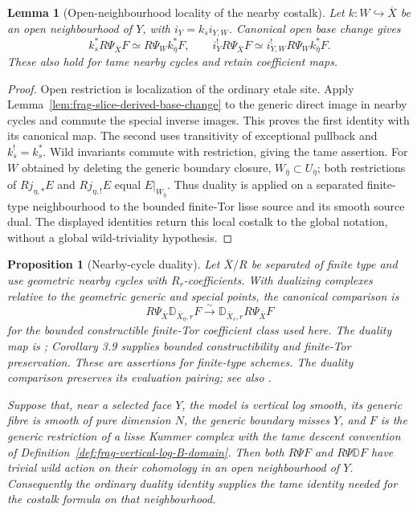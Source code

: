 \documentclass[11pt]{article}
\newtheorem{proposition}[theorem]{Proposition}
\newtheorem{lemma}[theorem]{Lemma}
\theoremstyle{definition}
\theoremstyle{remark}
\begin{document}
\begin{lemma}[Open-neighbourhood locality of the nearby costalk]
\label{lem:frag-nearby-costalk-open-locality}
Let $k:W\hookrightarrow\overline X$ be an open neighbourhood of $Y$,
with $i_Y=k_s i_{Y,W}$.  Canonical open base change gives
\[
 k_s^*R\Psi_{\overline X}F\simeq R\Psi_W k_{\bar\eta}^*F,
 \qquad
 i_Y^!R\Psi_{\overline X}F\simeq
 i_{Y,W}^!R\Psi_W k_{\bar\eta}^*F.
\]
These also hold for tame nearby cycles and retain coefficient maps.
\end{lemma}
\begin{proof}
Open restriction is localization of the ordinary etale site.  Apply
Lemma~\ref{lem:frag-slice-derived-base-change} to the generic direct
image in nearby cycles and commute the special inverse images.
This proves the first identity with its canonical map.  The second
uses transitivity of exceptional pullback and $k_s^!=k_s^*$.
Wild invariants commute with restriction, giving the tame assertion.
For $W$ obtained by deleting the generic boundary closure,
$W_{\bar\eta}\subset U_{\bar\eta}$; both restrictions of
$Rj_{\eta,*}E$ and $Rj_{\eta,!}E$ equal $E|_{W_{\bar\eta}}$.
Thus duality is applied on a separated finite-type neighbourhood to
the bounded finite-Tor lisse source and its smooth source dual.
The displayed identities return this local costalk to the global
notation, without a global wild-triviality hypothesis.
\end{proof}

\begin{proposition}[Nearby-cycle duality]
\label{prop:frag-S-nearby-duality}
Let $\overline X/R$ be separated of finite type and use geometric nearby
cycles with $R_r$-coefficients.  With dualizing complexes relative to the
geometric generic and special points, the canonical comparison is
\[
 R\Psi_{\overline X}\mathbb D_{\overline X_{\bar\eta},r}F
 \xrightarrow{\sim}
 \mathbb D_{\overline X_s,r}R\Psi_{\overline X}F
\]
for the bounded constructible finite-Tor coefficient class used here.
The duality map is \cite[Corollary 3.8]{LuZhengNearbyDuality};
Corollary 3.9 supplies bounded constructibility and finite-Tor
preservation.  These are assertions for finite-type schemes.
The duality comparison preserves its evaluation pairing; see also
\cite[\S3.1]{LuZhengNearbyDuality}.

Suppose that, near a selected face $Y$, the model is vertical log smooth,
its generic fibre is smooth of pure dimension $N$, the generic boundary
misses $Y$, and $F$ is the generic restriction of a lisse Kummer complex
with the tame descent convention of
Definition~\ref{def:frag-vertical-log-B-domain}.
Then both $R\Psi F$ and $R\Psi\mathbb D F$ have trivial wild action on
their cohomology in an open neighbourhood of $Y$.  Consequently the
ordinary duality identity supplies the tame identity needed for the
costalk formula on that neighbourhood.
\end{proposition}
\end{document}
